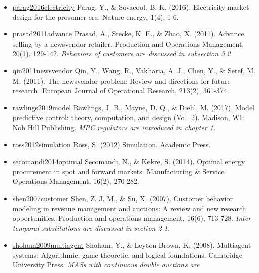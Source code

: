 \documentclass[letterpaper,8pt,twocolumn,twoside,]{pinp}
\begin{document}
\begin{itemize}
\item
  \href{https://www.nature.com/articles/nenergy201632}{parag2016electricity}
  Parag, Y., \& Sovacool, B. K. (2016). Electricity market design for
  the prosumer era. Nature energy, 1(4), 1-6.
\item
  \href{https://onlinelibrary.wiley.com/doi/abs/10.1111/j.1937-5956.2010.01133.x?casa_token=lVRyRU67RhMAAAAA:8Dj0zKFhuT8i_4hkKs0PDvKRC3RUMLWaJk_poEYL7Z9oYcOJVB4-ZsEuT18KN15fuZcrCWLtaAeNayg}{prasad2011advance}
  Prasad, A., Stecke, K. E., \& Zhao, X. (2011). Advance selling by a
  newsvendor retailer. Production and Operations Management, 20(1),
  129-142. \emph{Behaviors of customers are discussed in subsection 3.2}
\item
  \href{https://www.sciencedirect.com/science/article/pii/S0377221710008040}{qin2011newsvendor}
  Qin, Y., Wang, R., Vakharia, A. J., Chen, Y., \& Seref, M. M. (2011).
  The newsvendor problem: Review and directions for future research.
  European Journal of Operational Research, 213(2), 361-374.
\item
  \href{https://sites.engineering.ucsb.edu/~jbraw/mpc/}{rawlings2019model}
  Rawlings, J. B., Mayne, D. Q., \& Diehl, M. (2017). Model predictive
  control: theory, computation, and design (Vol. 2). Madison, WI: Nob
  Hill Publishing. \emph{MPC regulators are introduced in chapter 1.}
\item
  \href{https://www.elsevier.com/books/simulation/ross/978-0-12-415825-2}{ross2012simulation}
  Ross, S. (2012) Simulation. Academic Press.
\item
  \href{https://pubsonline.informs.org/doi/10.1287/msom.2013.0473}{secomandi2014optimal}
  Secomandi, N., \& Kekre, S. (2014). Optimal energy procurement in spot
  and forward markets. Manufacturing \& Service Operations Management,
  16(2), 270-282.
\item
  \href{https://onlinelibrary.wiley.com/doi/abs/10.1111/j.1937-5956.2007.tb00291.x}{shen2007customer}
  Shen, Z. J. M., \& Su, X. (2007). Customer behavior modeling in
  revenue management and auctions: A review and new research
  opportunities. Production and operations management, 16(6), 713-728.
  \emph{Inter-temporal substitutions are discussed in section 2-1.}
\item
  \href{https://www.cambridge.org/core/books/multiagent-systems/B11B69E0CB9032D6EC0A254F59922360}{shoham2009multiagent}
  Shoham, Y., \& Leyton-Brown, K. (2008). Multiagent systems:
  Algorithmic, game-theoretic, and logical foundations. Cambridge
  University Press. \emph{MASs with continuous double auctions are
}
\end{itemize}
\end{document}
